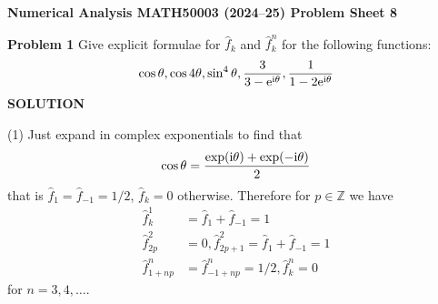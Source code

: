 \documentclass[12pt,a4paper]{article}
\def\endash{–}
\def\bbZ{ {\mathbb Z} }
\begin{document}
\textbf{Numerical Analysis MATH50003 (2024\ensuremath{\endash}25) Problem Sheet 8}

\textbf{Problem 1} Give explicit formulae for $\hat f_k$ and $\hat f_k^n$ for the following functions:
\[
\cos \ensuremath{\theta}, \cos 4\ensuremath{\theta}, \sin^4\ensuremath{\theta}, {3 \over 3 - {\rm e}^{\rm i \ensuremath{\theta}}}, {1 \over 1 - 2{\rm e}^{\rm i \ensuremath{\theta}}}
\]
\textbf{SOLUTION}

(1) Just expand in complex exponentials to find that
\[
\cos \ensuremath{\theta} = {\exp({\rm i} \ensuremath{\theta}) + \exp(-{\rm i} \ensuremath{\theta}) \over 2}
\]
that is $\hat f_1 = \hat f_{-1} = 1/2$, $\hat f_k = 0$ otherwise. Therefore for $p\ensuremath{\in} \ensuremath{\bbZ}$ we have
\begin{align*}
\hat f_k^1 &= \hat f_1 + \hat f_{-1} = 1 \\
\hat f_{2p}^2 &= 0, \hat f_{2p+1}^2 = \hat f_1 + \hat f_{-1} = 1 \\
\hat f_{1+np}^n &= \hat f_{-1+np}^n = 1/2, \hat f_k^n = 0
\end{align*}
for $n = 3,4,\ensuremath{\ldots}$.
\end{document}
